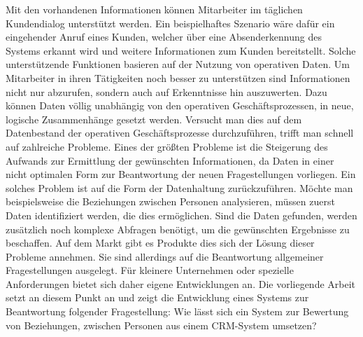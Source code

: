 Mit den vorhandenen Informationen können Mitarbeiter im täglichen Kundendialog unterstützt werden. Ein beispielhaftes Szenario wäre dafür ein eingehender Anruf eines Kunden, welcher über eine Absenderkennung des Systems erkannt wird und weitere Informationen zum Kunden bereitstellt. Solche unterstützende Funktionen basieren auf der Nutzung von operativen Daten. Um Mitarbeiter in ihren Tätigkeiten noch besser zu unterstützen sind Informationen nicht nur abzurufen, sondern auch auf Erkenntnisse hin auszuwerten. Dazu können Daten völlig unabhängig von den operativen Geschäftsprozessen, in neue, logische Zusammenhänge gesetzt werden. Versucht man dies auf dem Datenbestand der operativen Geschäftsprozesse durchzuführen, trifft man schnell auf zahlreiche Probleme. Eines der größten Probleme ist die Steigerung des Aufwands zur Ermittlung der gewünschten Informationen, da Daten in einer nicht optimalen Form zur Beantwortung der neuen Fragestellungen vorliegen. Ein solches Problem ist auf die Form der Datenhaltung zurückzuführen. Möchte man beispielsweise die Beziehungen zwischen Personen analysieren, müssen zuerst Daten identifiziert werden, die dies ermöglichen. Sind die Daten gefunden, werden zusätzlich noch komplexe Abfragen benötigt, um die gewünschten Ergebnisse zu beschaffen. Auf dem Markt gibt es Produkte dies sich der Lösung dieser Probleme annehmen. Sie sind allerdings auf die Beantwortung allgemeiner Fragestellungen ausgelegt. Für kleinere Unternehmen oder spezielle Anforderungen bietet sich daher eigene Entwicklungen an. Die vorliegende Arbeit setzt an diesem Punkt an und zeigt die Entwicklung eines Systems zur Beantwortung folgender Fragestellung: Wie lässt sich ein System zur Bewertung von Beziehungen, zwischen Personen aus einem CRM-System umsetzen?






